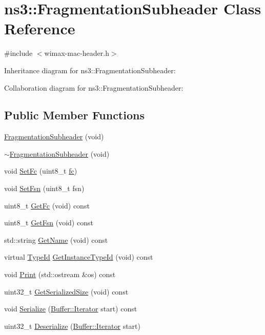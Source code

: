\hypertarget{classns3_1_1FragmentationSubheader}{}\section{ns3\+:\+:Fragmentation\+Subheader Class Reference}
\label{classns3_1_1FragmentationSubheader}


{\ttfamily \#include $<$wimax-\/mac-\/header.\+h$>$}



Inheritance diagram for ns3\+:\+:Fragmentation\+Subheader\+:


Collaboration diagram for ns3\+:\+:Fragmentation\+Subheader\+:
\subsection*{Public Member Functions}
\begin{DoxyCompactItemize}
\item 
\hyperlink{classns3_1_1FragmentationSubheader_a3658991e26bca34f24148fc9c31a89b7}{Fragmentation\+Subheader} (void)
\item 
\hyperlink{classns3_1_1FragmentationSubheader_af1f6ee61e0a1a9dd65739938efd07fe1}{$\sim$\+Fragmentation\+Subheader} (void)
\item 
void \hyperlink{classns3_1_1FragmentationSubheader_ad9c1cf0f05c03e72d4750d89e50c2ab4}{Set\+Fc} (uint8\+\_\+t \hyperlink{lte__uplink__power__control_8m_a72d54db2b27ce046aab6e6a414c407e9}{fc})
\item 
void \hyperlink{classns3_1_1FragmentationSubheader_ac039a83ab989fe21557282127e53c26b}{Set\+Fsn} (uint8\+\_\+t fsn)
\item 
uint8\+\_\+t \hyperlink{classns3_1_1FragmentationSubheader_ad796f851f0da640a5e732be1e28dc15d}{Get\+Fc} (void) const 
\item 
uint8\+\_\+t \hyperlink{classns3_1_1FragmentationSubheader_a6d8c453b30a1ad82e0c5df19b0036761}{Get\+Fsn} (void) const 
\item 
std\+::string \hyperlink{classns3_1_1FragmentationSubheader_a169acd16299a760ce7e2718465b356eb}{Get\+Name} (void) const 
\item 
virtual \hyperlink{classns3_1_1TypeId}{Type\+Id} \hyperlink{classns3_1_1FragmentationSubheader_a3e4e7b974a5183ae292a97e63e1e2bc5}{Get\+Instance\+Type\+Id} (void) const 
\item 
void \hyperlink{classns3_1_1FragmentationSubheader_a523950a5f53cfb3b11e4a4713fdc4d96}{Print} (std\+::ostream \&os) const 
\item 
uint32\+\_\+t \hyperlink{classns3_1_1FragmentationSubheader_a02c1dedb4e9588d40fac967efeee5ad0}{Get\+Serialized\+Size} (void) const 
\item 
void \hyperlink{classns3_1_1FragmentationSubheader_a048643f7ed33ed6cb802fbd6f88ec03c}{Serialize} (\hyperlink{classns3_1_1Buffer_1_1Iterator}{Buffer\+::\+Iterator} start) const 
\item 
uint32\+\_\+t \hyperlink{classns3_1_1FragmentationSubheader_a8292bc4f480ba4a8d9bfdceddc2d6316}{Deserialize} (\hyperlink{classns3_1_1Buffer_1_1Iterator}{Buffer\+::\+Iterator} start)
\end{DoxyCompactItemize}
